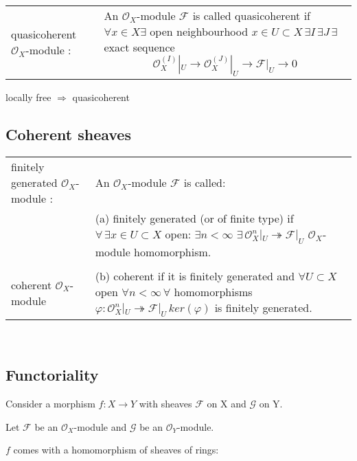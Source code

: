 \documentclass[a4paper, 12pt]{article}
\newcommand{\ca}[1]{\mathcal{#1}}
\newcommand{\caf}{\mathcal{F}}
\newcommand{\cag}{\mathcal{G}}
\newcommand{\oxmod}{$\mathcal{O}_X$-module }
\newcommand{\ox}{\mathcal{O}_X}
\begin{document}
\begin{tabular}{p{4cm} p{12cm}}


quasicoherent \oxmod: & An \oxmod $\caf$ is called quasicoherent if $\forall x\in X \exists$ open neighbourhood $x\in U \subset X\,  \exists I\, \exists J\, \exists $ exact sequence
  \[
\ox^{(I)}|_U \longrightarrow \ox^{(J)}|_U \longrightarrow \caf|_U \longrightarrow 0
\]
\\
\end{tabular}


locally free $\Longrightarrow$ quasicoherent





\subsection{Coherent sheaves}

\begin{tabular}{p{4cm} p{12cm}}



finitely generated \oxmod : & An \oxmod $\caf$ is called: \\
  & (a) finitely generated (or of finite type) if $\forall\,\exists x\in U \subset X $
  open:
  $\exists n < \infty$ $\exists \, \ox^n|_U \twoheadrightarrow \caf|_U$  \oxmod  homomorphism.
\\

&\\

coherent \oxmod &(b) coherent if it is finitely generated and $\forall U \subset X $ open $\forall n < \infty \, \forall$
homomorphisms $\varphi : \ox^n|_U \twoheadrightarrow \caf|_U \, ker(\varphi)$ is
finitely generated. \\
\end{tabular}

\\
%


  
  



\subsection{Functoriality}

Consider a morphism $f:X\longrightarrow Y$ with sheaves $\caf$ on X and $\cag$ on Y.

Let $\caf$ be an \oxmod and $\cag$ be an $\ca{O}_Y$-module.

$f$ comes with a homomorphism of sheaves of rings:
\end{document}
